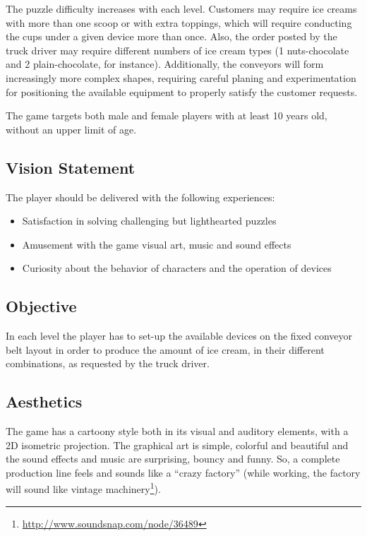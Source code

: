\documentclass[a4paper]{scrartcl}
\begin{document}
    The puzzle difficulty increases with each level. Customers may require ice
    creams with more than one scoop or with extra toppings, which will require
    conducting the cups under a given device more than once. Also, the order
    posted by the truck driver may require different numbers of ice cream types
    (1 nuts-chocolate and 2 plain-chocolate, for instance). Additionally, the
    conveyors will form increasingly more complex shapes, requiring careful
    planing and experimentation for positioning the available equipment to
    properly satisfy the customer requests.

    The game targets both male and female players with at least 10 years old,
    without an upper limit of age.

    \subsection{Vision Statement}
        The player should be delivered with the following experiences:
        \begin{itemize}
            \item Satisfaction in solving challenging but lighthearted puzzles
            \item Amusement with the game visual art, music and sound effects
            \item Curiosity about the behavior of characters and the operation
                  of devices
        \end{itemize}

    \subsection{Objective}
        In each level the player has to set-up the available devices on the
        fixed conveyor belt layout in order to produce the amount of ice cream,
        in their different combinations, as requested by the truck driver.

    \subsection{Aesthetics}
        The game has a cartoony style both in its visual and auditory elements,
        with a 2D isometric projection. The graphical art is simple, colorful
        and beautiful and the sound effects and music are surprising, bouncy and
        funny. So, a complete production line feels and sounds like a ``crazy
        factory'' (while working, the factory will sound like vintage
        machinery\footnote{\url{http://www.soundsnap.com/node/36489}}).
\end{document}
